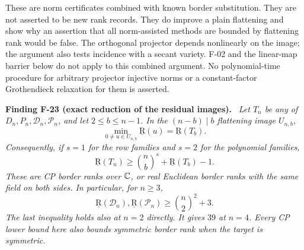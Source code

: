 \documentclass[11pt]{article}
\newcommand{\BR}{\underline{\mathrm R}}\newcommand{\TR}{\mathrm R}
\newenvironment{finding}[2]{\par\medskip\noindent\textbf{Finding #1 (#2).}\ \itshape}{\par\medskip}
\begin{document}
These are norm certificates combined with known border substitution.
They are not asserted to be new rank records.
They do improve a plain flattening and show why an assertion that
all norm-assisted methods are bounded by flattening rank would be
false. The orthogonal projector depends nonlinearly on the image;
the argument also tests incidence with a secant variety. F-02 and
the linear-map barrier below do not apply to this combined argument.
No polynomial-time procedure for arbitrary projector injective norms
or a constant-factor Grothendieck relaxation for them is asserted.

\begin{finding}{F-23}{exact reduction of the residual images}
Let $T_n$ be any of $D_n,P_n,\mathcal D_n,\mathcal P_n$,
and let $2\leq b\leq n-1$. In the $(n-b)\mid b$
flattening image $U_{n,b}$,
\begin{equation}\label{eq:exact-residual}
 \min_{0\ne u\in U_{n,b}}\BR(u)=\BR(T_b).
\end{equation}
Consequently, if $s=1$ for the row families and $s=2$
for the polynomial families,
\begin{equation}\label{eq:recursive-image}
 \BR(T_n)\geq\binom nb^{s}+\BR(T_b)-1.
\end{equation}
These are CP border ranks over $\mathbb C$, or real Euclidean border
ranks with the same field on both sides.
In particular, for $n\geq3$,
\[
 \BR(\mathcal D_n),\BR(\mathcal P_n)\geq\binom n2^2+3.
\]
The last inequality holds also at $n=2$ directly. It gives $39$
at $n=4$. Every CP lower bound here also bounds symmetric
border rank when the target is symmetric.
\end{finding}
\end{document}
